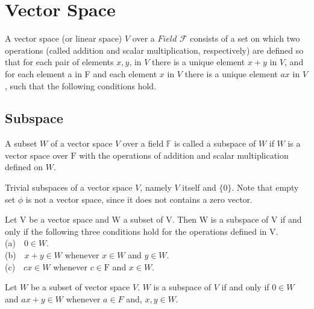 \section{Vector Space}
 
\begin{defn} %
 A vector space (or linear space) $V$ over a $Field$ $\mathcal{F}$ consists of a set on which two operations (called addition and scalar multiplication, respectively) are defined so that for each pair of elements $x, y$, in $V$ there is a unique element $x+y$ in $V$, and for each element a in F and each element $x$ in $V$ there is a unique element $ax$ in $V$, such that the following conditions hold.
 
\end{defn}


\subsection{Subspace}

\begin{defn}[Subspace] %
	A subset $W$ of a vector space $V$ over a field $\mathbb{F}$ is called a subspace of $W$ if $W$ is a vector space over $\mathrm{F}$ with the operations of addition and scalar multiplication defined on $W$.
\end{defn}

\begin{rmk*} %
	Trivial subspaces of a vector space $V$, namely $V$ itself and $\{0\}$. Note that empty set $\phi$ is not a vector space, since it does not contains a zero vector.
\end{rmk*}

\begin{thm}%
Let V be a vector space and W a subset of V. Then W is a subspace of V if and only if the following three conditions hold for the operations defined in V.
\\
(a)\ \ $0 \in W.$ \\
(b)\ \ $x+y \in W$ whenever $x \in W$ and $y \in W.$ \\
(c)\ \ $cx \in W$ whenever $c \in \mathrm{F}$ and $x \in W.$ \\

\end{thm}

\begin{cor}[ex 1.3.18] %
	Let $W$ be a subset of vector space $V$. $W$ is a subspace of $V$ if and only if $0\in W$ and $ax+y \in W$ whenever $a \in F$ and, $ x,y \in W$.
\end{cor}
\pfshow{}


